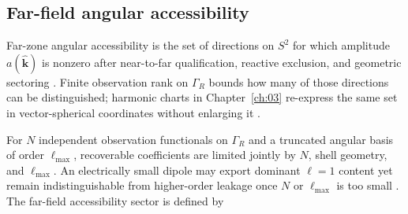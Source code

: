 \subsection{Far-field angular accessibility}
\label{sec:ch294}
Far-zone angular accessibility is the set of directions on $S^2$ for which amplitude
$a(\widehat{\mathbf{k}})$ is nonzero after near-to-far qualification, reactive exclusion, and
geometric sectoring \cite{harrington2001,stratton1941}. Finite observation rank on $\Gamma_R$
bounds how many of those directions can be distinguished; harmonic charts in Chapter~\ref{ch:03}
re-express the same set in vector-spherical coordinates without enlarging it \cite{hansen1988}.

For $N$ independent observation functionals on $\Gamma_R$ and a truncated angular basis of order
$\ell_{\max}$, recoverable coefficients are limited jointly by $N$, shell geometry, and
$\ell_{\max}$. An electrically small dipole may export dominant $\ell=1$ content yet remain
indistinguishable from higher-order leakage once $N$ or $\ell_{\max}$ is too small
\cite{stratton1941}. The far-field accessibility sector is defined by
\label{eq:ch2.angular-accessibility-sector}

